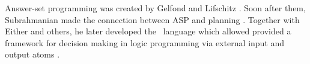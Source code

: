 Answer-set programming was created by Gelfond and Lifschitz \cite{asp1}. Soon after them, Subrahmanian made the connection between ASP and planning \cite{Subrahmanian95relatingstable}. Together with Either and others, he later developed the \acthex\ language which allowed provided a framework for decision making in logic programming via external input and output atoms \cite{heterogeneous1, heterogeneous2, heterogeneous3}.